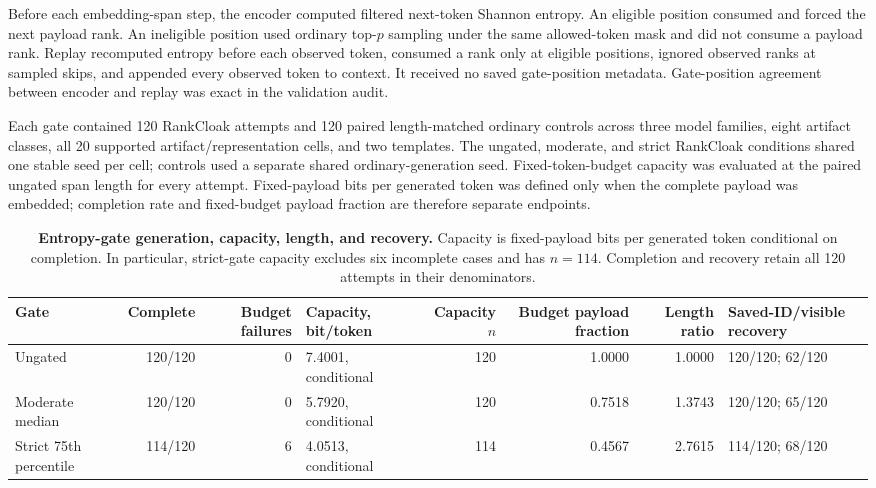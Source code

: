 \documentclass[fleqn,10pt]{wlscirep}
\begin{document}
Before each embedding-span step, the encoder computed filtered next-token Shannon entropy. An eligible position consumed and forced the next payload rank. An ineligible position used ordinary top-\(p\) sampling under the same allowed-token mask and did not consume a payload rank. Replay recomputed entropy before each observed token, consumed a rank only at eligible positions, ignored observed ranks at sampled skips, and appended every observed token to context. It received no saved gate-position metadata. Gate-position agreement between encoder and replay was exact in the validation audit.

Each gate contained 120 RankCloak attempts and 120 paired length-matched ordinary controls across three model families, eight artifact classes, all 20 supported artifact/representation cells, and two templates. The ungated, moderate, and strict RankCloak conditions shared one stable seed per cell; controls used a separate shared ordinary-generation seed. Fixed-token-budget capacity was evaluated at the paired ungated span length for every attempt. Fixed-payload bits per generated token was defined only when the complete payload was embedded; completion rate and fixed-budget payload fraction are therefore separate endpoints.

\begin{table}[H]
\centering
\scriptsize
\setlength{\tabcolsep}{3pt}
\begin{tabularx}{\textwidth}{L{0.13\textwidth}r r L{0.18\textwidth}r r r Y}
\toprule
Gate & Complete & Budget failures & Capacity, bit/token & Capacity \(n\) & Budget payload fraction & Length ratio & Saved-ID/visible recovery \\
\midrule
Ungated & 120/120 & 0 & 7.4001, conditional & 120 & 1.0000 & 1.0000 & 120/120; 62/120 \\
Moderate median & 120/120 & 0 & 5.7920, conditional & 120 & 0.7518 & 1.3743 & 120/120; 65/120 \\
Strict 75th percentile & 114/120 & 6 & 4.0513, conditional & 114 & 0.4567 & 2.7615 & 114/120; 68/120 \\
\bottomrule
\end{tabularx}
\caption{\label{tab:v3-entropy-generation}\textbf{Entropy-gate generation, capacity, length, and recovery.} Capacity is fixed-payload bits per generated token conditional on completion. In particular, strict-gate capacity excludes six incomplete cases and has \(n=114\). Completion and recovery retain all 120 attempts in their denominators.}
\end{table}
\end{document}
